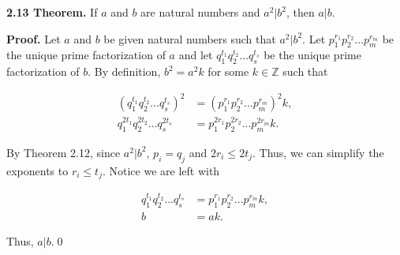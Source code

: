 \documentclass[12pt]{article}
\begin{document}
\noindent\textbf{2.13 Theorem.} If $a$ and $b$ are natural numbers and $a^2 | b^2$, then $a|b$.

\bigskip

\noindent\textbf{Proof.} Let $a$ and $b$ be given natural numbers such that $a^2 | b^2$. Let $p_{1}^{r_{1}}p_{2}^{r_{2}}...p_{m}^{r_{m}}$ be the unique prime factorization of $a$ and let $q_{1}^{t_{1}}q_{2}^{t_{2}}...q_{s}^{t_{s}}$ be the unique prime factorization of $b$. By definition, $b^2=a^2k$ for some $k\in\mathbb{Z}$ such that

\begin{align*}
(q_{1}^{t_{1}}q_{2}^{t_{2}}...q_{s}^{t_{s}})^2 &= (p_{1}^{r_{1}}p_{2}^{r_{2}}...p_{m}^{r_{m}})^2k, \\
q_{1}^{2t_{1}}q_{2}^{2t_{2}}...q_{s}^{2t_{s}} &= p_{1}^{2r_{1}}p_{2}^{2r_{2}}...p_{m}^{2r_{m}}k.
\end{align*} 

\noindent By Theorem 2.12, since $a^2|b^2$, $p_{i}=q_{j}$ and $2r_{i}\leq 2t_{j}$. Thus, we can simplify the exponents to $r_{i}\leq t_{j}$. Notice we are left with 

\begin{align*}
q_{1}^{t_{1}}q_{2}^{t_{2}}...q_{s}^{t_{s}} &= p_{1}^{r_{1}}p_{2}^{r_{2}}...p_{m}^{r_{m}}k, \\
b &= ak.
\end{align*}

\noindent Thus, $a|b$.\qed
\end{document}
